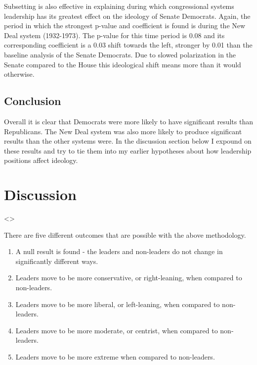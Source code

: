 \documentclass[12pt,twoside]{reedthesis}
\begin{document}
  Subsetting is also effective in explaining during which congressional
  systems leadership has its greatest effect on the ideology of Senate
  Democrats. Again, the period in which the strongest p-value and
  coefficient is found is during the New Deal system (1932-1973). The
  p-value for this time period is 0.08 and its corresponding coefficient
  is a 0.03 shift towards the left, stronger by 0.01 than the baseline
  analysis of the Senate Democrats. Due to slowed polarization in the
  Senate compared to the House this ideological shift means more than it
  would otherwise.
  
  \section{Conclusion}\label{conclusion}
  
  Overall it is clear that Democrats were more likely to have significant
  results than Republicans. The New Deal system was also more likely to
  produce significant results than the other systems were. In the
  discussion section below I expound on these results and try to tie them
  into my earlier hypotheses about how leadership positions affect
  ideology.
  
  \chapter{Discussion}\label{discussion}
  
  \textless{}\textgreater{}
  
  There are five different outcomes that are possible with the above
  methodology.
  
  \begin{enumerate}
  \def\labelenumi{\arabic{enumi}.}
  \itemsep1pt\parskip0pt
  \item
    A null result is found - the leaders and non-leaders do not change in
    significantly different ways.
  \item
    Leaders move to be more conservative, or right-leaning, when compared
    to non-leaders.
  \item
    Leaders move to be more liberal, or left-leaning, when compared to
    non-leaders.
  \item
    Leaders move to be more moderate, or centrist, when compared to
    non-leaders.
  \item
    Leaders move to be more extreme when compared to non-leaders.
  \end{enumerate}
  
\end{document}
